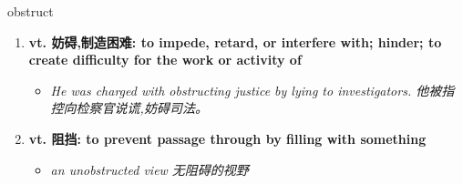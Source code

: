 
\begin{frame}
{\huge obstruct}
\begin{center}
\begin{enumerate}\Large
  \item \textbf{vt. 妨碍,制造困难: to impede, retard, or interfere with; hinder; to create difficulty for the work or activity of}
  \begin{itemize}
    \item \em{\Large{He was charged with obstructing justice by lying to investigators. 他被指控向检察官说谎,妨碍司法。}}
  \end{itemize}
  \item \textbf{vt. 阻挡: to prevent passage through by filling with something}
  \begin{itemize}
    \item \em{\Large{an unobstructed view 无阻碍的视野}}
  \end{itemize}
\end{enumerate}
\end{center}
\end{frame}
